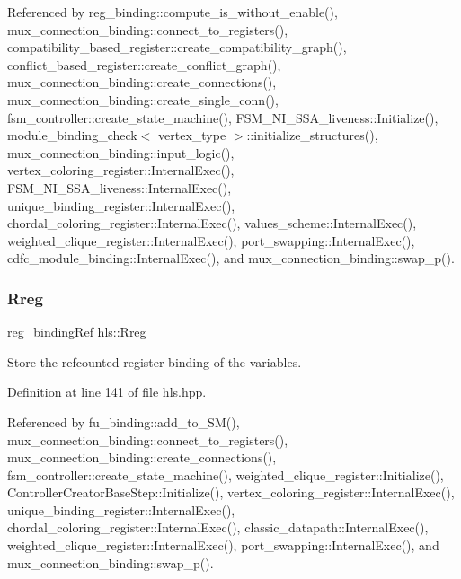 Referenced by reg\+\_\+binding\+::compute\+\_\+is\+\_\+without\+\_\+enable(), mux\+\_\+connection\+\_\+binding\+::connect\+\_\+to\+\_\+registers(), compatibility\+\_\+based\+\_\+register\+::create\+\_\+compatibility\+\_\+graph(), conflict\+\_\+based\+\_\+register\+::create\+\_\+conflict\+\_\+graph(), mux\+\_\+connection\+\_\+binding\+::create\+\_\+connections(), mux\+\_\+connection\+\_\+binding\+::create\+\_\+single\+\_\+conn(), fsm\+\_\+controller\+::create\+\_\+state\+\_\+machine(), F\+S\+M\+\_\+\+N\+I\+\_\+\+S\+S\+A\+\_\+liveness\+::\+Initialize(), module\+\_\+binding\+\_\+check$<$ vertex\+\_\+type $>$\+::initialize\+\_\+structures(), mux\+\_\+connection\+\_\+binding\+::input\+\_\+logic(), vertex\+\_\+coloring\+\_\+register\+::\+Internal\+Exec(), F\+S\+M\+\_\+\+N\+I\+\_\+\+S\+S\+A\+\_\+liveness\+::\+Internal\+Exec(), unique\+\_\+binding\+\_\+register\+::\+Internal\+Exec(), chordal\+\_\+coloring\+\_\+register\+::\+Internal\+Exec(), values\+\_\+scheme\+::\+Internal\+Exec(), weighted\+\_\+clique\+\_\+register\+::\+Internal\+Exec(), port\+\_\+swapping\+::\+Internal\+Exec(), cdfc\+\_\+module\+\_\+binding\+::\+Internal\+Exec(), and mux\+\_\+connection\+\_\+binding\+::swap\+\_\+p().

\mbox{\label{classhls_acde7b0e5735648a52b1e3c719f1c9d6e}} 
\subsubsection{\texorpdfstring{Rreg}{Rreg}}
{\footnotesize\ttfamily \hyperlink{reg__binding_8hpp_aa41bd7902f9f054af782503a16789fd2}{reg\+\_\+binding\+Ref} hls\+::\+Rreg}



Store the refcounted register binding of the variables. 



Definition at line 141 of file hls.\+hpp.



Referenced by fu\+\_\+binding\+::add\+\_\+to\+\_\+\+S\+M(), mux\+\_\+connection\+\_\+binding\+::connect\+\_\+to\+\_\+registers(), mux\+\_\+connection\+\_\+binding\+::create\+\_\+connections(), fsm\+\_\+controller\+::create\+\_\+state\+\_\+machine(), weighted\+\_\+clique\+\_\+register\+::\+Initialize(), Controller\+Creator\+Base\+Step\+::\+Initialize(), vertex\+\_\+coloring\+\_\+register\+::\+Internal\+Exec(), unique\+\_\+binding\+\_\+register\+::\+Internal\+Exec(), chordal\+\_\+coloring\+\_\+register\+::\+Internal\+Exec(), classic\+\_\+datapath\+::\+Internal\+Exec(), weighted\+\_\+clique\+\_\+register\+::\+Internal\+Exec(), port\+\_\+swapping\+::\+Internal\+Exec(), and mux\+\_\+connection\+\_\+binding\+::swap\+\_\+p().

